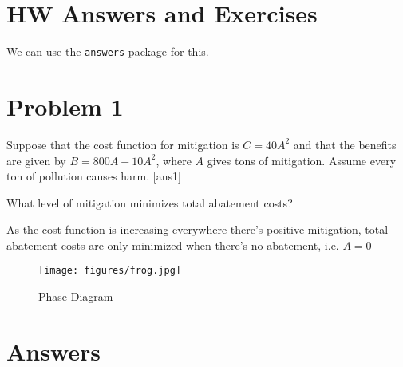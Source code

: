 
\section{HW Answers and Exercises}\label{sec:hw-exercises-answers}

We can use the \verb+answers+ package for this.

\section*{Problem 1}
 Suppose that the cost function for mitigation is $C=40A^2$ and that the benefits are given by $B=800A-10A^2$, where $A$ gives tons of mitigation. Assume every ton of pollution causes harm.
 [ans1] %
\begin{ex}
What level of mitigation minimizes total abatement costs?

\begin{sol}
  As the cost function is increasing everywhere there's positive mitigation, total abatement costs are only minimized when there's no abatement, i.e. $A=0$
\end{sol}
  \end{ex}
  
       \begin{figure}[H]
	\centering %
	\texttt{[image: figures/frog.jpg]}
	\caption{Phase Diagram} %
	\label{fig:ps02phasediag}
\end{figure}



\section{Answers}
